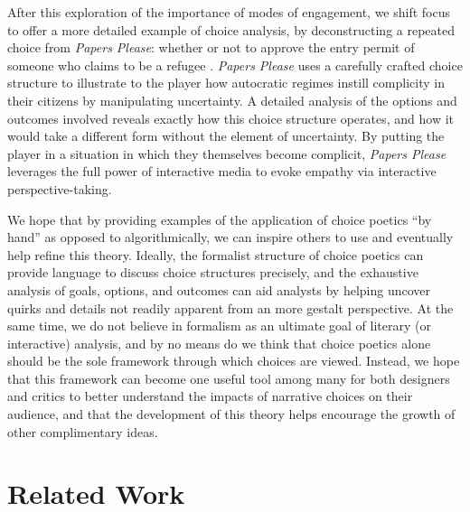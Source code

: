 \documentclass[arts,article,submit,moreauthors,pdftex,10pt,a4paper]{Definitions/mdpi}
\begin{document}
After this exploration of the importance of modes of engagement, we shift focus to offer a more detailed example of choice analysis, by deconstructing a repeated choice from \emph{Papers Please}: whether or not to approve the entry permit of someone who claims to be a refugee \citep{pope2013papers}.
%
\emph{Papers Please} uses a carefully crafted choice structure to illustrate to the player how autocratic regimes instill complicity in their citizens by manipulating uncertainty.
%
A detailed analysis of the options and outcomes involved reveals exactly how this choice structure operates, and how it would take a different form without the element of uncertainty.
%
By putting the player in a situation in which they themselves become complicit, \emph{Papers Please} leverages the full power of interactive media to evoke empathy via interactive perspective-taking.


We hope that by providing examples of the application of choice poetics ``by hand'' as opposed to algorithmically, we can inspire others to use and eventually help refine this theory.
%
Ideally, the formalist structure of choice poetics can provide language to discuss choice structures precisely, and the exhaustive analysis of goals, options, and outcomes can aid analysts by helping uncover quirks and details not readily apparent from an more gestalt perspective.
%
At the same time, we do not believe in formalism as an ultimate goal of literary (or interactive) analysis, and by no means do we think that choice poetics alone should be the sole framework through which choices are viewed.
%
Instead, we hope that this framework can become one useful tool among many for both designers and critics to better understand the impacts of narrative choices on their audience, and that the development of this theory helps encourage the growth of other complimentary ideas.

\section{Related Work}
\end{document}

